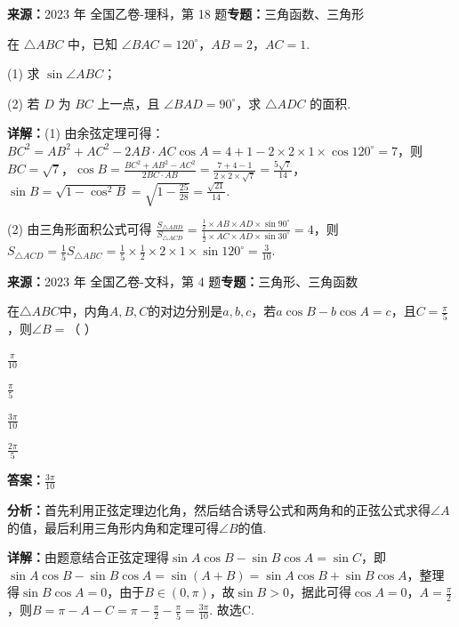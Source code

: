 \begin{question}[points=12]
\textbf{来源：}2023 年 全国乙卷-理科，第 18 题\quad \textbf{专题：}三角函数、三角形\par
在 $\triangle ABC$ 中，已知 $\angle BAC=120^\circ$，$AB=2$，$AC=1$.



(1) 求 $\sin\angle ABC$；



(2) 若 $D$ 为 $BC$ 上一点，且 $\angle BAD=90^\circ$，求 $\triangle ADC$ 的面积.
\begin{solution}

\textbf{详解：}(1) 由余弦定理可得：$BC^2=AB^2+AC^2-2AB\cdot AC\cos A=4+1-2\times2\times1\times\cos120^\circ=7$，则 $BC=\sqrt{7}$，$\cos B=\frac{BC^2+AB^2-AC^2}{2BC\cdot AB}=\frac{7+4-1}{2\times2\times\sqrt{7}}=\frac{5\sqrt{7}}{14}$，$\sin B=\sqrt{1-\cos^2B}=\sqrt{1-\frac{25}{28}}=\frac{\sqrt{21}}{14}$.

(2) 由三角形面积公式可得 $\frac{S_{\triangle ABD}}{S_{\triangle ACD}}=\frac{\frac{1}{2}\times AB\times AD\times\sin90^\circ}{\frac{1}{2}\times AC\times AD\times\sin30^\circ}=4$，则 $S_{\triangle ACD}=\frac{1}{5}S_{\triangle ABC}=\frac{1}{5}\times\frac{1}{2}\times2\times1\times\sin120^\circ=\frac{3}{10}$.
\end{solution}
\end{question}

\begin{question}[points=5]
\textbf{来源：}2023 年 全国乙卷-文科，第 4 题\quad \textbf{专题：}三角形、三角函数\par
在$\triangle ABC$中，内角$A,B,C$的对边分别是$a,b,c$，若$a\cos B-b\cos A=c$，且$C=\frac{\pi}{5}$，则$\angle B=$（   ）
\begin{choices}
  \item $\frac{\pi}{10}$
  \item $\frac{\pi}{5}$
  \item $\frac{3\pi}{10}$
  \item $\frac{2\pi}{5}$
\end{choices}
\begin{solution}
\textbf{答案：}$\frac{3\pi}{10}$

\textbf{分析：}首先利用正弦定理边化角，然后结合诱导公式和两角和的正弦公式求得$\angle A$的值，最后利用三角形内角和定理可得$\angle B$的值.

\textbf{详解：}由题意结合正弦定理得$\sin A\cos B-\sin B\cos A=\sin C$，即$\sin A\cos B-\sin B\cos A=\sin(A+B)=\sin A\cos B+\sin B\cos A$，整理得$\sin B\cos A=0$，由于$B\in(0,\pi)$，故$\sin B>0$，据此可得$\cos A=0$，$A=\frac{\pi}{2}$，则$B=\pi-A-C=\pi-\frac{\pi}{2}-\frac{\pi}{5}=\frac{3\pi}{10}$. 故选C.
\end{solution}
\end{question}

